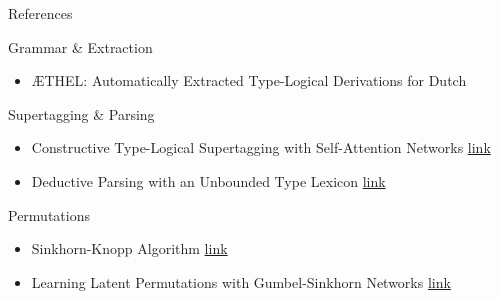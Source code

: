 \documentclass{beamer}
\begin{document}
\begin{frame}{References}
	\small 
	
	\begin{block}{Grammar \& Extraction}
		\begin{itemize}
			\item \AE THEL: Automatically Extracted Type-Logical Derivations for Dutch \href{https://arxiv.org/abs/1912.12635}{\color{blue}{link}}
		\end{itemize}
		
	\end{block}
	
	\begin{block}{Supertagging \& Parsing}
		\begin{itemize}
			\item Constructive Type-Logical Supertagging with Self-Attention Networks \href{https://arxiv.org/abs/1905.13418}{\color{blue}link}
			\item Deductive Parsing with an Unbounded Type Lexicon \href{https://hal-lirmm.ccsd.cnrs.fr/lirmm-02313572/document}{\color{blue}link}
		\end{itemize}
	\end{block}
	
	\begin{block}{Permutations}
		\begin{itemize}
		\item Sinkhorn-Knopp Algorithm \href{http://yaroslavvb.com/papers/sinkhorn-concerning.pdf}{\color{blue}link}
		\item Learning Latent Permutations with Gumbel-Sinkhorn Networks \href{https://arxiv.org/abs/1802.08665}{\color{blue}link}
		\end{itemize}
	\end{block}
\end{frame}
\end{document}
